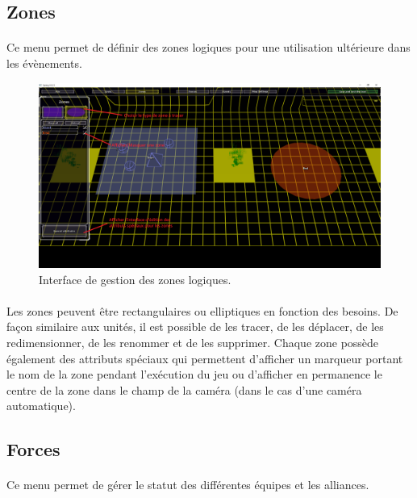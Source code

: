 \documentclass[a4paper]{article}
\begin{document}
\subsection{Zones}
\paragraph{ }
Ce menu permet de définir des zones logiques pour une utilisation ultérieure dans les évènements.
\begin{figure}[H]
\centering
\includegraphics[width=\linewidth]{editor-zones.png}
\caption{Interface de gestion des zones logiques.}
\label{fig:editor-zones}
\end{figure}
\paragraph{ }
Les zones peuvent être rectangulaires ou elliptiques en fonction des besoins. De façon similaire aux unités, il est possible de les tracer, de les déplacer, de les redimensionner, de les renommer et de les supprimer. Chaque zone possède également des attributs spéciaux qui permettent d'afficher un marqueur portant le nom de la zone pendant l'exécution du jeu ou d'afficher en permanence le centre de la zone dans le champ de la caméra (dans le cas d'une caméra automatique).
\subsection{Forces}
\paragraph{ }
Ce menu permet de gérer le statut des différentes équipes et les alliances.
\end{document}
